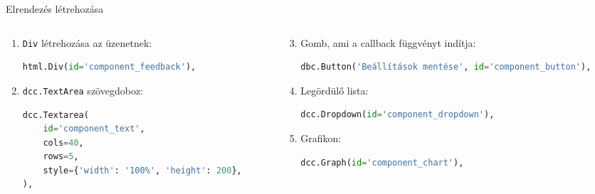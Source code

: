 \documentclass[english, aspectratio=169]{beamer}
\begin{document}
	\begin{frame}[fragile]{Elrendezés létrehozása}
		\begin{columns}
			\begin{column}{.5\textwidth}
				\begin{enumerate}
					\item \texttt{Div} létrehozása az üzenetnek:
					\begin{lstlisting}[language=python]
html.Div(id='component_feedback'),
					\end{lstlisting}
					\item \texttt{dcc.TextArea} szövegdoboz:
					\begin{lstlisting}[language=python]
dcc.Textarea(
	id='component_text',
	cols=40,
	rows=5,
	style={'width': '100%', 'height': 200},
),
					\end{lstlisting}
				\end{enumerate}
			\end{column}
			\begin{column}{.5\textwidth}
				\begin{enumerate}
					\setcounter{enumi}{2}
					\item Gomb, ami a callback függvényt indítja:
					\begin{lstlisting}[language=python]
dbc.Button('Beállítások mentése', id='component_button'),
					\end{lstlisting}
					\item Legördülő lista:
					\begin{lstlisting}[language=python]
dcc.Dropdown(id='component_dropdown'),
					\end{lstlisting}
					\item Grafikon:
					\begin{lstlisting}[language=python]
dcc.Graph(id='component_chart'),
					\end{lstlisting}
				\end{enumerate}
			\end{column}
		\end{columns}
	\end{frame}
	
\end{document}
